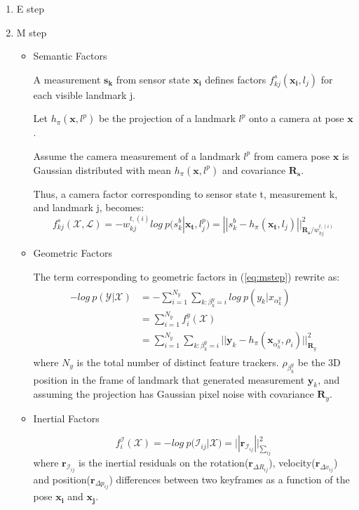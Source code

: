 \documentclass[12pt]{article}
\numberwithin{equation}{section}
\begin{document}
\begin{enumerate}
	\item E step
	\item M step
		\begin{itemize}
		\item Semantic Factors \par
			A measurement $\bm{s_k}$ from sensor state $\bm{x_i}$ defines factors 
			$f^s_{kj}(\bm{x_i}, l_j)$ for each visible landmark j. \par
			Let $h_{\pi}(\bm{x}, l^p)$ be the projection of a landmark $l^p$ onto a camera at pose 
			$\bm{x}$. \par
			Assume the camera measurement of a landmark $l^p$ from camera pose $\bm{x}$ is 
			Gaussian distributed with mean $h_{\pi}(\bm{x}, l^p)$ and covariance $\bm{R_s}$. \par
			Thus, a camera factor corresponding to sensor state t, measurement k, and landmark j, 
			becomes:
			\begin{equation}
				f^s_{kj}(\mathcal{X}, \mathcal{L})= -w^{t,(i)}_{kj} log \ p(s_k^b|\bm{x_t}, l_j^p)
				=||s_k^b-h_\pi (\bm{x_t}, l_j)||^2_{\bm{R_s}/w^{t,(i)}_{kj}}
			\end{equation}
		\item Geometric Factors \par
			The term corresponding to geometric factors in (\ref{eq:mstep}) rewrite as:
			\begin{align}\begin{split}
			- log\ p(\mathcal{Y}|\mathcal{X}) 
			&=-\sum^{N_y}_{i=1}\sum_{k:\beta^y_k=i} log\ p(y_k|x_{\alpha^y_k}) \\
			&=\sum^{N_y}_{i=1}f^y_i(\mathcal{X}) \\
			&=\sum^{N_y}_{i=1}\sum_{k:\beta^y_k=i}||\bm{y}_k-h_\pi (\bm{x}_{\alpha_k^y}, \rho_i)||^2_{\bm{R}_y}
			\end{split}\end{align}
			where $N_y$ is the total number of distinct feature trackers. $\rho_{\beta^y_k}$ be the 3D position in the frame of landmark that generated measurement $\bm{y}_k$, and assuming the projection has Gaussian pixel noise with covariance $\bm{R}_y$. \par
		\item Inertial Factors \par
			\begin{equation}
				f^{\mathcal{I}}_i(\mathcal{X})
				=-log \ p(\mathcal{I}_{ij}|\mathcal{X})
				=||\bm{r}_{\mathcal{I}_{ij}}||^2_{\sum_{ij}}
			\end{equation}
			where $\bm{r}_{\mathcal{I}_{ij}}$ is the inertial residuals on the rotation($\bm{r}_{\Delta R_{ij}}$), velocity($\bm{r}_{\Delta v_{ij}}$) and position($\bm{r}_{\Delta p_{ij}}$) differences between two keyframes as a function of the pose $\bm{x_i}$ and $\bm{x_j}$.
		\end{itemize}
\end{enumerate}
\end{document}
